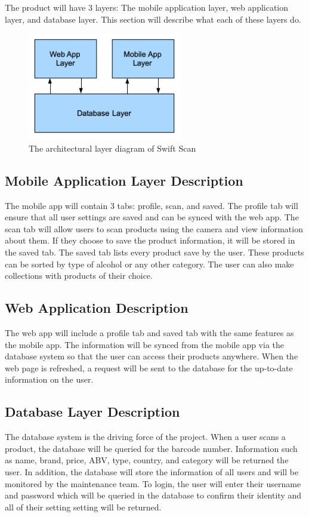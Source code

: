 The product will have 3 layers: The mobile application layer, web application layer, and database layer. This section will describe what each of these layers do.

\begin{figure}[h!]
	\centering
 	\includegraphics[width=0.60\textwidth]{images/architectural_layer_diagram.png}
 \caption{The architectural layer diagram of Swift Scan}
\end{figure}

\subsection{Mobile Application Layer Description}
The mobile app will contain 3 tabs: profile, scan, and saved. The profile tab will ensure that all user settings are saved and can be synced with the web app. The scan tab will allow users to scan products using the camera and view information about them. If they choose to save the product information, it will be stored in the saved tab. The saved tab lists every product save by the user. These products can be sorted by type of alcohol or any other category. The user can also make collections with products of their choice. 

\subsection{Web Application Description}
The web app will include a profile tab and saved tab with the same features as the mobile app. The information will be synced from the mobile app via the database system so that the user can access their products anywhere. When the web page is refreshed, a request will be sent to the database for the up-to-date information on the user.

\subsection{Database Layer Description}
The database system is the driving force of the project. When a user scans a product, the database will be queried for the barcode number. Information such as name, brand, price, ABV, type, country, and category will be returned the user. In addition, the database will store the information of all users and will be monitored by the maintenance team. To login, the user will enter their username and password which will be queried in the database to confirm their identity and all of their setting setting will be returned. 
